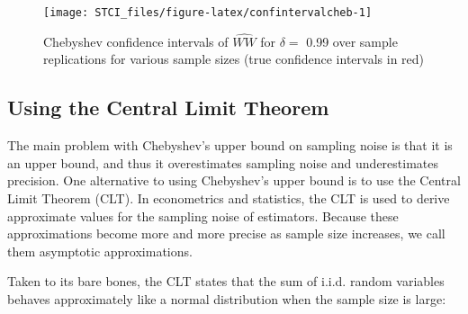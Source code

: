 \documentclass[]{book}
\newenvironment{Shaded}{\begin{snugshade}}{\end{snugshade}}
\newcommand{\KeywordTok}[1]{\textcolor[rgb]{0.13,0.29,0.53}{\textbf{#1}}}
\newcommand{\DataTypeTok}[1]{\textcolor[rgb]{0.13,0.29,0.53}{#1}}
\newcommand{\DecValTok}[1]{\textcolor[rgb]{0.00,0.00,0.81}{#1}}
\newcommand{\StringTok}[1]{\textcolor[rgb]{0.31,0.60,0.02}{#1}}
\newcommand{\OperatorTok}[1]{\textcolor[rgb]{0.81,0.36,0.00}{\textbf{#1}}}
\newcommand{\NormalTok}[1]{#1}
\theoremstyle{definition}
\theoremstyle{definition}
\theoremstyle{definition}
\theoremstyle{remark}
\begin{document}
\begin{Shaded}
\end{Shaded}

\begin{figure}[htbp]

{\centering \texttt{[image: STCI\_files/figure-latex/confintervalcheb-1]} 

}

\caption{Chebyshev confidence intervals of $\hat{WW}$ for $\delta=$ 0.99 over sample replications for various sample sizes (true confidence intervals in red)}\label{fig:confintervalcheb}
\end{figure}

\subsection{Using the Central Limit Theorem}\label{sec:CLT}

The main problem with Chebyshev's upper bound on sampling noise is that
it is an upper bound, and thus it overestimates sampling noise and
underestimates precision. One alternative to using Chebyshev's upper
bound is to use the Central Limit Theorem (CLT). In econometrics and
statistics, the CLT is used to derive approximate values for the
sampling noise of estimators. Because these approximations become more
and more precise as sample size increases, we call them asymptotic
approximations.

Taken to its bare bones, the CLT states that the sum of i.i.d. random
variables behaves approximately like a normal distribution when the
sample size is large:
\end{document}
